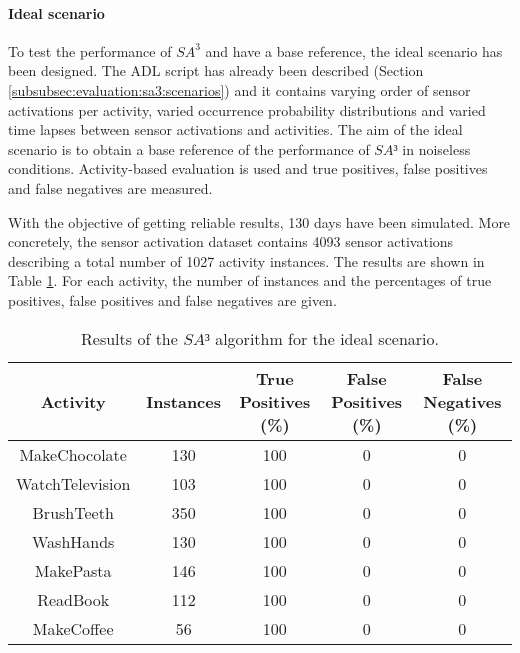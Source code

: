 \paragraph*{Ideal scenario}

To test the performance of $SA^3$ and have a base reference, the ideal scenario has been designed. The ADL script has already been described (Section \ref{subsubsec:evaluation:sa3:scenarios}) and it contains varying order of sensor activations per activity, varied occurrence probability distributions and varied time lapses between sensor activations and activities. The aim of the ideal scenario is to obtain a base reference of the performance of $SA³$ in noiseless conditions. Activity-based evaluation is used and true positives, false positives and false negatives are measured. 

With the objective of getting reliable results, 130 days have been simulated. More concretely, the sensor activation dataset contains 4093 sensor activations describing a total number of 1027 activity instances. The results are shown in Table \ref{tab-sa3-ideal}. For each activity, the number of instances and the percentages of true positives, false positives and false negatives are given.

\begin{table}[htbp]\scriptsize
  \begin{center}
        \begin{tabular}{ccccc}
            \hline            
            \textbf{Activity} & \textbf{Instances} & \textbf{True Positives (\%)} &  \textbf{False Positives (\%)} & \textbf{False Negatives (\%)}\\             
            \hline
            MakeChocolate   & 130 & 100 & 0 & 0 \\
	    WatchTelevision & 103 & 100 & 0 & 0 \\
	    BrushTeeth      & 350 & 100 & 0 & 0 \\
	    WashHands       & 130 & 100 & 0 & 0 \\
	    MakePasta       & 146 & 100 & 0 & 0 \\
	    ReadBook        & 112 & 100 & 0 & 0 \\
	    MakeCoffee      & 56 & 100 & 0 & 0 \\
            \hline
        \end{tabular}                
        \caption{Results of the $SA³$ algorithm for the ideal scenario.}
        \label{tab-sa3-ideal}
    \end{center}
\end{table}

